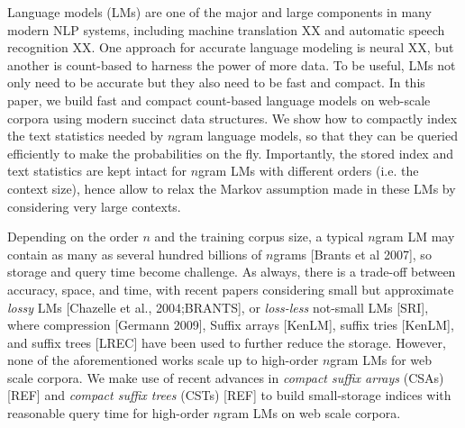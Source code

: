 Language models (LMs) are one of the major and large components in many modern NLP systems, including machine translation XX and automatic speech recognition XX.
%
One approach for accurate language modeling is neural XX, but another is  count-based to harness the power of more data.
%
%
To be useful, LMs not only need to be accurate but they also need to be fast and compact.
%
In this paper, we build  fast and compact count-based language models on web-scale corpora using modern succinct data structures.
%
We show how to compactly index the text statistics needed by $n$gram language models, so that they can be queried efficiently to make the probabilities on the fly.       
%
Importantly, the stored index and text statistics are kept intact for $n$gram LMs with different orders (i.e. the context size), hence allow to relax the
Markov assumption made in these LMs by considering very large contexts.



Depending on the order $n$ and the training corpus size, a typical $n$gram LM may contain as many as several hundred billions of $n$grams [Brants et al 2007],
so storage and query time become challenge.
%
As always, there is a trade-off between accuracy, space, and time, with recent papers considering small but approximate  \emph{lossy} LMs [Chazelle et al., 2004;BRANTS],
or \emph{loss-less}  not-small LMs [SRI], where compression [Germann 2009], Suffix arrays [KenLM], suffix tries [KenLM], and suffix trees [LREC]  have been used to further reduce the storage.
% 
However, none of the aforementioned works scale up to high-order  $n$gram LMs for web scale corpora. 
%
We make use of recent advances in \emph{compact suffix arrays} (CSAs) [REF] and 
\emph{compact suffix trees} (CSTs) [REF] to build small-storage indices  with reasonable query time for high-order $n$gram LMs on web scale corpora.




